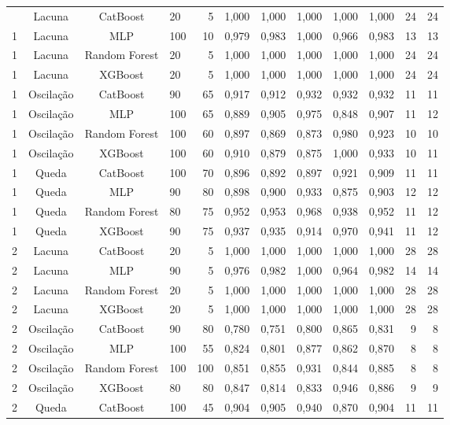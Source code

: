\begin{longtable}{ccclrrrrrrrr}
\bottomrule
\endlastfoot
1 & Lacuna & CatBoost & 20 & 5 & 1,000 & 1,000 & 1,000 & 1,000 & 1,000 & 24 & 24 \\
1 & Lacuna & MLP & 100 & 10 & 0,979 & 0,983 & 1,000 & 0,966 & 0,983 & 13 & 13 \\
1 & Lacuna & Random Forest & 20 & 5 & 1,000 & 1,000 & 1,000 & 1,000 & 1,000 & 24 & 24 \\
1 & Lacuna & XGBoost & 20 & 5 & 1,000 & 1,000 & 1,000 & 1,000 & 1,000 & 24 & 24 \\
1 & Oscilação & CatBoost & 90 & 65 & 0,917 & 0,912 & 0,932 & 0,932 & 0,932 & 11 & 11 \\
1 & Oscilação & MLP & 100 & 65 & 0,889 & 0,905 & 0,975 & 0,848 & 0,907 & 11 & 12 \\
1 & Oscilação & Random Forest & 100 & 60 & 0,897 & 0,869 & 0,873 & 0,980 & 0,923 & 10 & 10 \\
1 & Oscilação & XGBoost & 100 & 60 & 0,910 & 0,879 & 0,875 & 1,000 & 0,933 & 10 & 11 \\
1 & Queda & CatBoost & 100 & 70 & 0,896 & 0,892 & 0,897 & 0,921 & 0,909 & 11 & 11 \\
1 & Queda & MLP & 90 & 80 & 0,898 & 0,900 & 0,933 & 0,875 & 0,903 & 12 & 12 \\
1 & Queda & Random Forest & 80 & 75 & 0,952 & 0,953 & 0,968 & 0,938 & 0,952 & 11 & 12 \\
1 & Queda & XGBoost & 90 & 75 & 0,937 & 0,935 & 0,914 & 0,970 & 0,941 & 11 & 12 \\
2 & Lacuna & CatBoost & 20 & 5 & 1,000 & 1,000 & 1,000 & 1,000 & 1,000 & 28 & 28 \\
2 & Lacuna & MLP & 90 & 5 & 0,976 & 0,982 & 1,000 & 0,964 & 0,982 & 14 & 14 \\
2 & Lacuna & Random Forest & 20 & 5 & 1,000 & 1,000 & 1,000 & 1,000 & 1,000 & 28 & 28 \\
2 & Lacuna & XGBoost & 20 & 5 & 1,000 & 1,000 & 1,000 & 1,000 & 1,000 & 28 & 28 \\
2 & Oscilação & CatBoost & 90 & 80 & 0,780 & 0,751 & 0,800 & 0,865 & 0,831 & 9 & 8 \\
2 & Oscilação & MLP & 100 & 55 & 0,824 & 0,801 & 0,877 & 0,862 & 0,870 & 8 & 8 \\
2 & Oscilação & Random Forest & 100 & 100 & 0,851 & 0,855 & 0,931 & 0,844 & 0,885 & 8 & 8 \\
2 & Oscilação & XGBoost & 80 & 80 & 0,847 & 0,814 & 0,833 & 0,946 & 0,886 & 9 & 9 \\
2 & Queda & CatBoost & 100 & 45 & 0,904 & 0,905 & 0,940 & 0,870 & 0,904 & 11 & 11 \\

\end{longtable}
